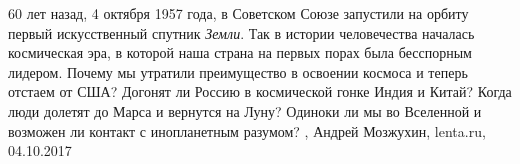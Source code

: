 60 лет назад, 4 октября 1957 года, в Советском Союзе запустили на орбиту первый
искусственный спутник \emph{Земли}. Так в истории человечества началась космическая
эра, в которой наша страна на первых порах была бесспорным лидером. Почему мы
утратили преимущество в освоении космоса и теперь отстаем от США? Догонят ли
Россию в космической гонке Индия и Китай? Когда люди долетят до Марса и
вернутся на Луну? Одиноки ли мы во Вселенной и возможен ли контакт с
инопланетным разумом?
, 
Андрей Мозжухин, lenta.ru, 04.10.2017

